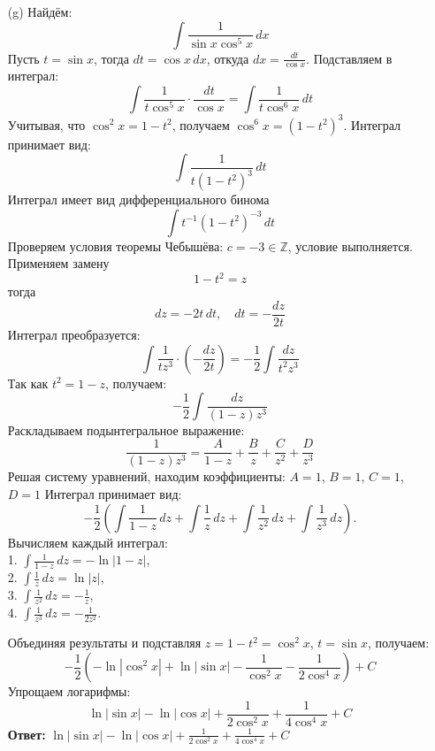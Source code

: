 \documentclass[a4paper]{article}
\begin{document}
\begin{enumerate}
\begin{enumerate}
    \item[(g)]Найдём:
    $$\int \frac{1}{\sin x \cos^5 x} \, dx$$
    Пусть \( t = \sin x \), тогда \( dt = \cos x \, dx \), откуда \( dx = \frac{dt}{\cos x} \). Подставляем в интеграл:  
    \[
    \int \frac{1}{t \cos^5 x} \cdot \frac{dt}{\cos x} = \int \frac{1}{t \cos^6 x} \, dt
    \]  
    Учитывая, что \( \cos^2 x = 1 - t^2 \), получаем \( \cos^6 x = (1 - t^2)^3 \). Интеграл принимает вид:  
    \[
    \int \frac{1}{t (1 - t^2)^3} \, dt
    \]  
    Интеграл имеет вид дифференциального бинома 
    \[ \int t^{-1} (1 - t^2)^{-3} \, dt \] 
    Проверяем условия теоремы Чебышёва:  
    \( c = -3 \in \mathbb{Z} \), условие выполняется.  
    Применяем замену \[ 1 - t^2 = z \]
    тогда \[ dz = -2t \, dt,\quad  dt = -\frac{dz}{2t} \]
    Интеграл преобразуется:  
    \[
    \int \frac{1}{t z^3} \cdot \left(-\frac{dz}{2t}\right) = -\frac{1}{2} \int \frac{dz}{t^2 z^3}
    \]  
    Так как \( t^2 = 1 - z \), получаем:  
    \[
    -\frac{1}{2} \int \frac{dz}{(1 - z) z^3}
    \]  
    Раскладываем подынтегральное выражение:  
    \[
    \frac{1}{(1 - z) z^3} = \frac{A}{1 - z} + \frac{B}{z} + \frac{C}{z^2} + \frac{D}{z^3}
    \]  
    Решая систему уравнений, находим коэффициенты:  
    \( A = 1 \), \( B = 1 \), \( C = 1 \), \( D = 1 \)
    Интеграл принимает вид:  
    \[
    -\frac{1}{2} \left( \int \frac{1}{1 - z} \, dz + \int \frac{1}{z} \, dz + \int \frac{1}{z^2} \, dz + \int \frac{1}{z^3} \, dz \right).
    \]  
    Вычисляем каждый интеграл:  \\
    1. \(\int \frac{1}{1 - z} \, dz = -\ln|1 - z|\),  \\
    2. \(\int \frac{1}{z} \, dz = \ln|z|\),  \\
    3. \(\int \frac{1}{z^2} \, dz = -\frac{1}{z}\),  \\
    4. \(\int \frac{1}{z^3} \, dz = -\frac{1}{2z^2}\).  

    Объединяя результаты и подставляя \( z = 1 - t^2 = \cos^2 x \), \( t = \sin x \), получаем:  
    \[
    -\frac{1}{2} \left( -\ln|\cos^2 x| + \ln|\sin x| - \frac{1}{\cos^2 x} - \frac{1}{2 \cos^4 x} \right) + C
    \]  
    Упрощаем логарифмы:  
    \[
    \ln|\sin x| - \ln|\cos x| + \frac{1}{2 \cos^2 x} + \frac{1}{4 \cos^4 x} + C
    \]  
    \textbf{Ответ: } $\ln|\sin x| - \ln|\cos x| + \frac{1}{2 \cos^2 x} + \frac{1}{4 \cos^4 x} + C$\\


\end{enumerate}
\end{enumerate}
\end{document}
